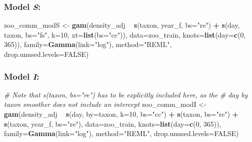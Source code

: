 \documentclass[12pt]{article}
\newenvironment{Shaded}{\begin{snugshade}}{\end{snugshade}}
\newcommand{\KeywordTok}[1]{\textcolor[rgb]{0.13,0.29,0.53}{\textbf{#1}}}
\newcommand{\DataTypeTok}[1]{\textcolor[rgb]{0.13,0.29,0.53}{#1}}
\newcommand{\DecValTok}[1]{\textcolor[rgb]{0.00,0.00,0.81}{#1}}
\newcommand{\StringTok}[1]{\textcolor[rgb]{0.31,0.60,0.02}{#1}}
\newcommand{\CommentTok}[1]{\textcolor[rgb]{0.56,0.35,0.01}{\textit{#1}}}
\newcommand{\OtherTok}[1]{\textcolor[rgb]{0.56,0.35,0.01}{#1}}
\newcommand{\OperatorTok}[1]{\textcolor[rgb]{0.81,0.36,0.00}{\textbf{#1}}}
\newcommand{\NormalTok}[1]{#1}
\begin{document}
\subsubsection{\texorpdfstring{Model
\emph{S}:}{Model S:}}\label{model-s-1}

\begin{Shaded}
\begin{Highlighting}[]
\NormalTok{zoo_comm_modS <-}\StringTok{ }\KeywordTok{gam}\NormalTok{(density_adj }\OperatorTok{~}\StringTok{ }\KeywordTok{s}\NormalTok{(taxon, year_f, }\DataTypeTok{bs=}\StringTok{"re"}\NormalTok{) }\OperatorTok{+}
\StringTok{                       }\KeywordTok{s}\NormalTok{(day, taxon, }\DataTypeTok{bs=}\StringTok{"fs"}\NormalTok{, }\DataTypeTok{k=}\DecValTok{10}\NormalTok{, }\DataTypeTok{xt=}\KeywordTok{list}\NormalTok{(}\DataTypeTok{bs=}\StringTok{"cc"}\NormalTok{)),}
                     \DataTypeTok{data=}\NormalTok{zoo_train, }\DataTypeTok{knots=}\KeywordTok{list}\NormalTok{(}\DataTypeTok{day=}\KeywordTok{c}\NormalTok{(}\DecValTok{0}\NormalTok{, }\DecValTok{365}\NormalTok{)),}
                     \DataTypeTok{family=}\KeywordTok{Gamma}\NormalTok{(}\DataTypeTok{link=}\StringTok{"log"}\NormalTok{), }\DataTypeTok{method=}\StringTok{"REML"}\NormalTok{,}
                     \DataTypeTok{drop.unused.levels=}\OtherTok{FALSE}\NormalTok{)}
\end{Highlighting}
\end{Shaded}

\subsubsection{\texorpdfstring{Model
\emph{I}:}{Model I:}}\label{model-i-1}

\begin{Shaded}
\begin{Highlighting}[]
\CommentTok{# Note that  s(taxon, bs="re") has to be explicitly included here, as the }
\CommentTok{# day by taxon smoother does not include an intercept}
\NormalTok{zoo_comm_modI <-}\StringTok{ }\KeywordTok{gam}\NormalTok{(density_adj }\OperatorTok{~}\StringTok{ }\KeywordTok{s}\NormalTok{(day, }\DataTypeTok{by=}\NormalTok{taxon, }\DataTypeTok{k=}\DecValTok{10}\NormalTok{, }\DataTypeTok{bs=}\StringTok{"cc"}\NormalTok{) }\OperatorTok{+}\StringTok{ }
\StringTok{                       }\KeywordTok{s}\NormalTok{(taxon, }\DataTypeTok{bs=}\StringTok{"re"}\NormalTok{) }\OperatorTok{+}\StringTok{ }\KeywordTok{s}\NormalTok{(taxon, year_f, }\DataTypeTok{bs=}\StringTok{"re"}\NormalTok{),}
                     \DataTypeTok{data=}\NormalTok{zoo_train, }\DataTypeTok{knots=}\KeywordTok{list}\NormalTok{(}\DataTypeTok{day=}\KeywordTok{c}\NormalTok{(}\DecValTok{0}\NormalTok{, }\DecValTok{365}\NormalTok{)),}
                     \DataTypeTok{family=}\KeywordTok{Gamma}\NormalTok{(}\DataTypeTok{link=}\StringTok{"log"}\NormalTok{), }\DataTypeTok{method=}\StringTok{"REML"}\NormalTok{,}
                     \DataTypeTok{drop.unused.levels=}\OtherTok{FALSE}\NormalTok{)}
\end{Highlighting}
\end{Shaded}
\end{document}
